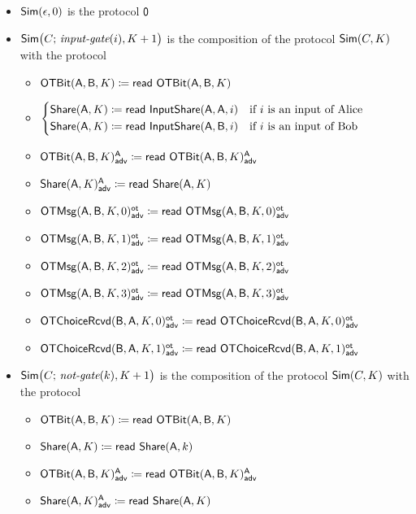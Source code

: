 \begin{itemize}
\item $\Sim(\epsilon,0)$ is the protocol $\zero$
\item $\Sim\big(C; \, \inputgate(i),K+1\big)$ is the composition of the protocol $\Sim(C,K)$ with the protocol
\begin{itemize}
\item $\OTBit(\A,\B,K) \coloneqq \read{\OTBit(\A,\B,K)}$
\item $\begin{cases*} \Share(\A,K) \coloneqq \read{\InputShare(\A,\A,i)} & \text{if $i$ is an input of Alice} \\ \Share(\A,K) \coloneqq \read{\InputShare(\A,\B,i)} & \text{if $i$ is an input of Bob} \end{cases*}$\medskip
\item {\color{blue} $\LeakOTBit(\A,\B,K)^\A_\adv \coloneqq \read{\LeakOTBit(\A,\B,K)^\A_\adv}$}
\item {\color{blue} $\LeakShare(\A,K)^\A_\adv \coloneqq \read{\Share(\A,K)}$}\medskip
\item {\color{blue} $\LeakOTMsg(\A,\B,K,0)^\ot_\adv \coloneqq \read{\LeakOTMsg(\A,\B,K,0)^\ot_\adv}$}
\item {\color{blue} $\LeakOTMsg(\A,\B,K,1)^\ot_\adv \coloneqq \read{\LeakOTMsg(\A,\B,K,1)^\ot_\adv}$}
\item {\color{blue} $\LeakOTMsg(\A,\B,K,2)^\ot_\adv \coloneqq \read{\LeakOTMsg(\A,\B,K,2)^\ot_\adv}$}
\item {\color{blue} $\LeakOTMsg(\A,\B,K,3)^\ot_\adv \coloneqq \read{\LeakOTMsg(\A,\B,K,3)^\ot_\adv}$}\medskip
\item {\color{blue} $\LeakOTChoiceRcvd(\B,\A,K,0)^\ot_\adv \coloneqq \read{\LeakOTChoiceRcvd(\B,\A,K,0)^\ot_\adv}$}
\item {\color{blue} $\LeakOTChoiceRcvd(\B,\A,K,1)^\ot_\adv \coloneqq \read{\LeakOTChoiceRcvd(\B,\A,K,1)^\ot_\adv}$}
\end{itemize}
\item $\Sim\big(C; \, \notgate(k),K+1\big)$ is the composition of the protocol $\Sim(C,K)$ with the protocol
\begin{itemize}
\item $\OTBit(\A,\B,K) \coloneqq \read{\OTBit(\A,\B,K)}$
\item $\Share(\A,K) \coloneqq \read{\Share(\A,k)}$\medskip
\item {\color{blue} $\LeakOTBit(\A,\B,K)^\A_\adv \coloneqq \read{\LeakOTBit(\A,\B,K)^\A_\adv}$}
\item {\color{blue} $\LeakShare(\A,K)^\A_\adv \coloneqq \read{\Share(\A,K)}$}\medskip

\end{itemize}
\end{itemize}
